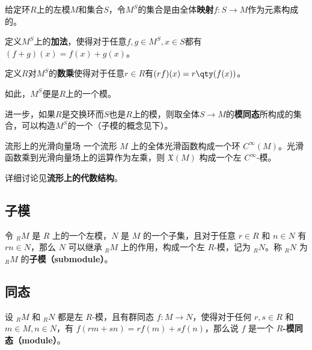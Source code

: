 \begin{example}{}

给定环$R$上的左模$M$和集合$S$，令$M^S$的集合是由全体\textbf{映射}$f:S\to M$作为元素构成的。

定义$M^S$上的\textbf{加法}，使得对于任意$f, g\in \phantom{}M^S, x\in S$都有$(f+g)(x)=f(x)+g(x)$。

定义$R$对$M^S$的\textbf{数乘}使得对于任意$r\in R$有$(rf)(x)=r\qty(f(x))$。

如此，$M^S$便是$R$上的一个模。

进一步，如果$R$是交换环而$S$也是$R$上的模，则取全体$S\to M$的\textbf{模同态}所构成的集合，可以构造$M^S$的一个（子模的概念见下）。

\end{example}

\begin{example}{流形上的光滑向量场}
一个流形 $M$ 上的全体光滑函数构成一个环 $C^{\infty}(M)$。光滑函数乘到光滑向量场上的运算作为左乘，则 $\mathfrak{X}(M)$ 构成一个左 $C^{\infty}$-模。

详细讨论见\textbf{流形上的代数结构}。
\end{example}


\subsection{子模}

令 $_RM$ 是 $R$ 上的一个左模，$N$ 是 $M$ 的一个子集，且对于任意 $r\in R$ 和 $n\in N$ 有 $rn\in N$，那么 $N$ 可以继承 $_RM$ 上的作用，构成一个左 $R$-模，记为 $_RN$。称 $_RN$ 为 $_RM$ 的\textbf{子模（submodule）}。


\subsection{同态}

设 $_RM$ 和 $_RN$ 都是左 $R$-模，且有群同态 $f:M\to N$，使得对于任何 $r, s\in R$ 和 $m\in M, n\in N$，有 $f(rm+sn)=rf(m)+sf(n)$，那么说 $f$ 是一个 $R$\textbf{-模同态（module）}。











